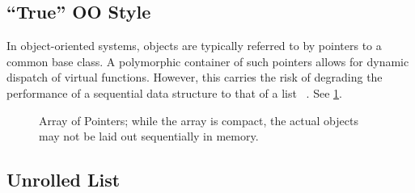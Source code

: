 \subsection{``True'' OO Style}

%


In object-oriented systems, objects are typically referred to by pointers to a common base
class.  A polymorphic container of such pointers allows for dynamic dispatch of virtual
functions.  However, this carries the risk of degrading the  performance of a
sequential data structure to that of a list%
~\cite[51:22]{stroustrup-talk}.
See \cref{fig:true-oo}.

\begin{figure}
   \centering
   
   \captionsetup{width=.9\linewidth} %
   \caption[Array of Pointers]{Array of Pointers; while the array is compact, the actual
   objects may not be laid out sequentially in memory.}
   \label{fig:true-oo}
\end{figure}

\subsection{Unrolled List}


